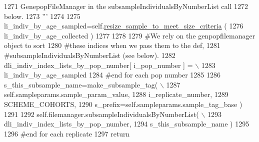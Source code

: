 \begin{DoxyCode}
1271 \textcolor{stringliteral}{                GenepopFileManager in the subsampleIndividualsByNumberList call}
1272 \textcolor{stringliteral}{                below.}
1273 \textcolor{stringliteral}{                '''}
1274 
1275                 li\_indiv\_by\_age\_sampled=self.\hyperlink{classnegui_1_1genepopfilesampler_1_1GenepopFileSamplerIndividualsAgeStructureCohorts_a28deaac6347b19f565b2a50f233a6f06}{resize\_sample\_to\_meet\_size\_criteria}
      ( 
1276                                                             li\_indiv\_by\_age\_collected ) 
1277 
1278 
1279                 \textcolor{comment}{#We rely on the genpopfilemanager object to sort }
1280                 \textcolor{comment}{#these indices when we pass them to the def,}
1281                 \textcolor{comment}{#subsampleIndividualsByNumberList (see below).}
1282                 dli\_indiv\_index\_lists\_by\_pop\_number[ i\_pop\_number ] = \(\backslash\)
1283                                                     li\_indiv\_by\_age\_sampled
1284             \textcolor{comment}{#end for each pop number}
1285             
1286             s\_this\_subsample\_name=make\_subsample\_tag( \(\backslash\)
1287                                 self.sampleparams.sample\_param\_value, 
1288                                 i\_replicate\_number, 
1289                                 SCHEME\_COHORTS,
1290                                 s\_prefix=self.sampleparams.sample\_tag\_base )
1291             
1292             self.filemanager.subsampleIndividualsByNumberList( \(\backslash\)
1293                                     dli\_indiv\_index\_lists\_by\_pop\_number,
1294                                     s\_this\_subsample\_name )
1295 
1296         \textcolor{comment}{#end for each replicate}
1297         \textcolor{keywordflow}{return}
\end{DoxyCode}
